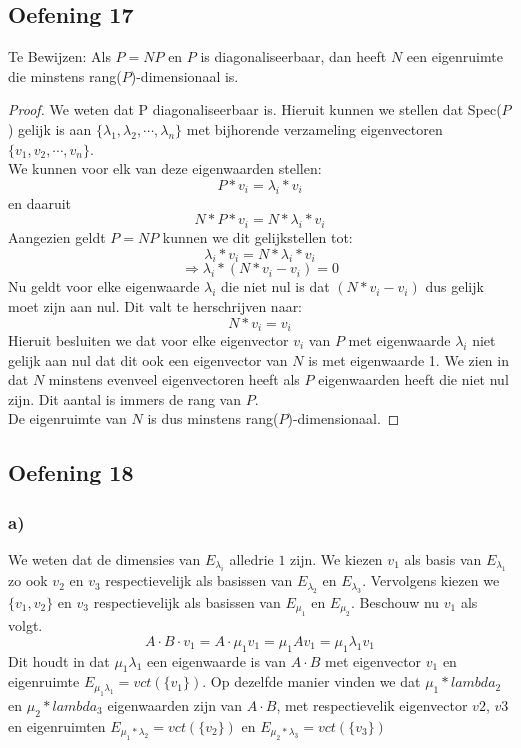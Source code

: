\documentclass[lineaire_algebra_oplossingen.tex]{subfiles}
\begin{document}
\subsection{Oefening 17}

Te Bewijzen:
Als $P = NP$ en $P$ is diagonaliseerbaar, dan heeft $N$ een eigenruimte die minstens rang($P$)-dimensionaal is.
\begin{proof}
We weten dat P diagonaliseerbaar is. Hieruit kunnen we stellen dat Spec($P$) gelijk is aan $\{\lambda_1, \lambda_2,\cdots,\lambda_n\}$ met bijhorende verzameling eigenvectoren $\{v_1, v_2,\cdots,v_n\}$.\\
We kunnen voor elk van deze eigenwaarden stellen:
\[P*v_i = \lambda_i*v_i\]
en daaruit
\[N*P*v_i = N*\lambda_i*v_i\]
Aangezien geldt $P=NP$ kunnen we dit gelijkstellen tot:
\[\lambda_i*v_i = N*\lambda_i*v_i\]
\[\Rightarrow \lambda_i * (N*v_i - v_i) = 0\]
Nu geldt voor elke eigenwaarde $\lambda_i$ die niet nul is dat $(N*v_i - v_i)$ dus gelijk moet zijn aan nul. Dit valt te herschrijven naar:
\[N*v_i = v_i\]
Hieruit besluiten we dat voor elke eigenvector $v_i$ van $P$ met eigenwaarde $\lambda_i$ niet gelijk aan nul dat dit ook een eigenvector van $N$ is met eigenwaarde 1.
We zien in dat $N$ minstens evenveel eigenvectoren heeft als $P$ eigenwaarden heeft die niet nul zijn. Dit aantal is immers de rang van $P$. \\
De eigenruimte van $N$ is dus minstens rang($P$)-dimensionaal.
\end{proof}


\subsection{Oefening 18}
\subsubsection*{a)}
We weten dat de dimensies van $E_{\lambda_i}$ alledrie $1$ zijn.
We kiezen $v_1$ als basis van $E_{\lambda_1}$ zo ook $v_2$ en $v_3$ respectievelijk als basissen van $E_{\lambda_2}$ en $E_{\lambda_3}$.
Vervolgens kiezen we $\{v_1,v_2\}$ en $v_3$ respectievelijk als basissen van $E_{\mu_1}$ en $E_{\mu_2}$.
Beschouw nu $v_1$ als volgt.
\[
A\cdot B\cdot v_1 = A\cdot\mu_1v_1 = \mu_1Av_1= \mu_1\lambda_1v_1
\]
Dit houdt in dat $\mu_1\lambda_1$ een eigenwaarde is van $A\cdot B$ met eigenvector $v_1$ en eigenruimte $E_{\mu_1\lambda_1} = vct(\{v_1\})$. Op dezelfde manier vinden we dat $\mu_1*lambda_2$ en $\mu_2*lambda_3$ eigenwaarden zijn van $A\cdot B$, met respectievelik eigenvector $v2$, $v3$ en eigenruimten $E_{\mu_1*\lambda_2} = vct(\{v_2\})$ en $E_{\mu_2*  \lambda_3} = vct(\{v_3\})$
\end{document}
